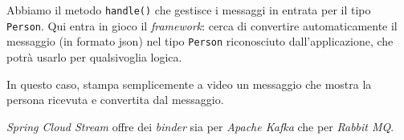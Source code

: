 Abbiamo il metodo \texttt{handle()} che gestisce i messaggi in entrata per il tipo \texttt{Person}.
Qui entra in gioco il \textit{framework}: cerca di convertire automaticamente il messaggio (in formato \acrshort{json}\gloss) nel tipo \texttt{Person} riconosciuto dall'applicazione, che potrà usarlo per qualsivoglia logica.

In questo caso, stampa semplicemente a video un messaggio che mostra la persona ricevuta e convertita dal messaggio.

\bigskip

\textit{Spring Cloud Stream} offre dei \textit{binder} sia per \textit{Apache Kafka} che per \textit{Rabbit MQ}.
